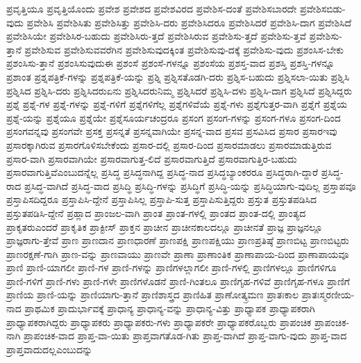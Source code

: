 {ಪ್ರವೃತ್ತಿಯೂ
ಪ್ರವೃತ್ತಿಯೊಂದು
ಪ್ರವೇಶ
ಪ್ರವೇಶದ
ಪ್ರವೇಶವಿರದ
ಪ್ರವೇಶಿಸ-ದಂತೆ
ಪ್ರವೇಶಿಸಬಾರದೇ
ಪ್ರವೇಶಿಸಬಿಡು-ವುದು
ಪ್ರವೇಶಿಸಿ
ಪ್ರವೇಶಿಸಿತು
ಪ್ರವೇಶಿಸಿತ್ತು
ಪ್ರವೇಶಿಸಿ-ದರು
ಪ್ರವೇಶಿಸಿದರೂ
ಪ್ರವೇಶಿಸಿದರೆ
ಪ್ರವೇಶಿಸಿ-ದಾಗ
ಪ್ರವೇಶಿಸಿದೆ
ಪ್ರವೇಶಿಸಿಯೇ
ಪ್ರವೇಶಿಸಿರ-ಬಹುದು
ಪ್ರವೇಶಿಸಿರು-ತ್ತದೆ
ಪ್ರವೇಶಿಸಿರುವ
ಪ್ರವೇಶಿಸು-ತ್ತದೆ
ಪ್ರವೇಶಿಸು-ತ್ತವೆ
ಪ್ರವೇಶಿಸು-ತ್ತಾನೆ
ಪ್ರವೇಶಿಸುವ
ಪ್ರವೇಶಿಸುವವರೆಗಿನ
ಪ್ರವೇಶಿಸುವುದಕ್ಕಿಂತ
ಪ್ರವೇಶಿಸುವು-ದಕ್ಕೆ
ಪ್ರವೇಶಿಸು-ವುದು
ಪ್ರಶಂಸಿಸ-ಬೇಕು
ಪ್ರಶಂಸಿಸು-ತ್ತಾನೆ
ಪ್ರಶಂಸಿಸುವುದುಈ
ಪ್ರಶಂಸೆ
ಪ್ರಶಂಸೆ-ಗಳನ್ನೂ
ಪ್ರಶಂಸೆಯ
ಪ್ರಶಸ್ತ-ವಾದ
ಪ್ರಶಸ್ತಿ
ಪ್ರಶಸ್ತಿ-ಗಳನ್ನೂ
ಪ್ರಶಾಂತ
ಪ್ರಶ್ನಪತ್ರಿಕೆ-ಗಳನ್ನು
ಪ್ರಶ್ನಪತ್ರಿಕೆ-ಯನ್ನು
ಪ್ರಶ್ನಿ
ಪ್ರಶ್ನಿಸತೊಡಗಿ-ದರು
ಪ್ರಶ್ನಿಸ-ಬಹುದು
ಪ್ರಶ್ನಿಸಲಾ-ಯಿತು
ಪ್ರಶ್ನಿಸಿ
ಪ್ರಶ್ನಿಸಿದ
ಪ್ರಶ್ನಿಸಿ-ದರು
ಪ್ರಶ್ನಿಸಿದರುಏನು
ಪ್ರಶ್ನಿಸಿದರುನಿಮ್ಮ
ಪ್ರಶ್ನಿಸಿದರೆ
ಪ್ರಶ್ನಿಸಿ-ದಳು
ಪ್ರಶ್ನಿಸಿ-ದಾಗ
ಪ್ರಶ್ನಿಸಿದೆ
ಪ್ರಶ್ನಿಸಿದ್ದರು
ಪ್ರಶ್ನೆ
ಪ್ರಶ್ನೆ-ಗಳ
ಪ್ರಶ್ನೆ-ಗಳನ್ನು
ಪ್ರಶ್ನೆ-ಗಳಿಗೆ
ಪ್ರಶ್ನೆಗಳಿಗೆಲ್ಲ
ಪ್ರಶ್ನೆಗಳಿವೆಯೆ
ಪ್ರಶ್ನೆ-ಗಳು
ಪ್ರಶ್ನೆಗುತ್ತರ-ವಾಗಿ
ಪ್ರಶ್ನೆಗೆ
ಪ್ರಶ್ನೆಯ
ಪ್ರಶ್ನೆ-ಯನ್ನು
ಪ್ರಶ್ನೆಯೂ
ಪ್ರಶ್ನೆಯೇ
ಪ್ರಶ್ನೆಸೂರ್ಯಚಂದ್ರರೂ
ಪ್ರಸಂಗ
ಪ್ರಸಂಗ-ಗಳನ್ನು
ಪ್ರಸಂಗ-ಗಳೂ
ಪ್ರಸಂಗ-ದಿಂದ
ಪ್ರಸಂಗವನ್ನವು
ಪ್ರಸಂಗವೇ
ಪ್ರಸಕ್ತ
ಪ್ರಸನ್ನತೆ
ಪ್ರಸನ್ನವಾಗಿಯೇ
ಪ್ರಸನ್ನ-ವಾದ
ಪ್ರಸವ
ಪ್ರಸವಿಸಿದ
ಪ್ರಸಾರ
ಪ್ರಸಾರಇವು
ಪ್ರಸಾರಕ್ಕಾಗಿರುವ
ಪ್ರಸಾರಗೊಳಿಸಬೇಕೆಂದು
ಪ್ರಸಾರ-ದಲ್ಲಿ
ಪ್ರಸಾರ-ದಿಂದ
ಪ್ರಸಾರಮಾಡಲು
ಪ್ರಸಾರಮಾಡುತ್ತಿರುವ
ಪ್ರಸಾರ-ವಾಗಿ
ಪ್ರಸಾರವಾಗಿಯೇ
ಪ್ರಸಾರವಾಗುತ್ತ-ಲಿದೆ
ಪ್ರಸಾರವಾಗುತ್ತಿದೆ
ಪ್ರಸಾರವಾಗುತ್ತಿರ-ಬಹುದು
ಪ್ರಸಾರವಾಗುತ್ತಿವೆಎಂಬುದನ್ನೆಲ್ಲ
ಪ್ರಸಿದ್ಧ
ಪ್ರಸಿದ್ಧನಾಗಿದ್ದ
ಪ್ರಸಿದ್ಧ-ನಾದ
ಪ್ರಸಿದ್ಧಬ್ಯಾಂಕರರೂ
ಪ್ರಸಿದ್ಧರಾಗಿ-ದ್ದಾರೆ
ಪ್ರಸಿದ್ಧ-ರಾದ
ಪ್ರಸಿದ್ಧ-ವಾಗಿದೆ
ಪ್ರಸಿದ್ಧ-ವಾದ
ಪ್ರಸಿದ್ಧಿ
ಪ್ರಸಿದ್ಧಿ-ಗಳನ್ನು
ಪ್ರಸಿದ್ಧಿಗೆ
ಪ್ರಸಿದ್ಧಿ-ಯನ್ನು
ಪ್ರಸಿದ್ಧಿಯಾಗು-ವುದಿಲ್ಲ
ಪ್ರಸ್ತಾಪವೂ
ಪ್ರಸ್ತಾಪಿಸದಿದ್ದರೂ
ಪ್ರಸ್ತಾಪಿಸಿ-ದ್ದೇನೆ
ಪ್ರಸ್ತಾಪಿಸಿಲ್ಲ
ಪ್ರಸ್ತಾಪಿ-ಸುತ್ತ
ಪ್ರಸ್ತಾಪಿಸುತ್ತಿದ್ದರು
ಪ್ರಸ್ತುತ
ಪ್ರಸ್ತುತಪಡಿಸಿದ
ಪ್ರಸ್ತುತಪಡಿಸಿ-ದ್ದೇನೆ
ಪ್ರಹ್ಲಾದ
ಪ್ರಾಂಜಲ-ವಾಗಿ
ಪ್ರಾಂತ
ಪ್ರಾಂತ-ಗಳಲ್ಲಿ
ಪ್ರಾಂತದ
ಪ್ರಾಂತ-ದಲ್ಲಿ
ಪ್ರಾಂತ್ಯದ
ಪ್ರಾಕೃತರುಎಂದರೆ
ಪ್ರಾಕೃತಿಕ
ಪ್ರಾಕ್ಟೀಸ್
ಪ್ರಾಕ್ತನ
ಪ್ರಾಚೀನ
ಪ್ರಾಚೀನಕಾಲದಲ್ಲೂ
ಪ್ರಾಚೀನತೆ
ಪ್ರಾಜ್ಞ
ಪ್ರಾಜ್ಞನಲ್ಲೂ
ಪ್ರಾಜ್ಞರಾಗು-ತ್ತೇವೆ
ಪ್ರಾಣ
ಪ್ರಾಣದಾನ
ಪ್ರಾಣಧಾರಣೆ
ಪ್ರಾಣಪಕ್ಷಿ
ಪ್ರಾಣಪಕ್ಷಿಯು
ಪ್ರಾಣಪ್ರತಿಷ್ಠೆ
ಪ್ರಾಣಬಿಟ್ಟ
ಪ್ರಾಣಬಿಟ್ಟರು
ಪ್ರಾಣರಕ್ಷಣೆ-ಗಾಗಿ
ಪ್ರಾಣ-ವನ್ನು
ಪ್ರಾಣವಾಯು
ಪ್ರಾಣವೇ
ಪ್ರಾಣಾ
ಪ್ರಾಣಾಂತಿಕ
ಪ್ರಾಣಾಪಾಯ-ದಿಂದ
ಪ್ರಾಣಾಪಾಯವೂ
ಪ್ರಾಣಿ
ಪ್ರಾಣಿ-ಯಾಗಲೀ
ಪ್ರಾಣಿ-ಗಳ
ಪ್ರಾಣಿ-ಗಳನ್ನು
ಪ್ರಾಣಿಗಳಲ್ಲಾಗಲೀ
ಪ್ರಾಣಿ-ಗಳಲ್ಲಿ
ಪ್ರಾಣಿಗಳಲ್ಲೂ
ಪ್ರಾಣಿಗಳಿಗೂ
ಪ್ರಾಣಿ-ಗಳಿಗೆ
ಪ್ರಾಣಿ-ಗಳು
ಪ್ರಾಣಿ-ಗಳೇ
ಪ್ರಾಣಿಗಳೊಡನೆ
ಪ್ರಾಣಿ-ಗಿಂತಲೂ
ಪ್ರಾಣಿಗೃಹ-ಗಳಿವೆ
ಪ್ರಾಣಿಗೃಹ-ಗಳೂ
ಪ್ರಾಣಿಗೆ
ಪ್ರಾಣಿಯ
ಪ್ರಾಣಿ-ಯನ್ನು
ಪ್ರಾಣಿಯಾಗು-ತ್ತಾನೆ
ಪ್ರಾಣಿಶಾಸ್ತ್ರದ
ಪ್ರಾಣಿಹಿತ
ಪ್ರಾಣೋತ್ಕ್ರಮಣ
ಪ್ರಾತಃಕಾಲ
ಪ್ರಾತಃಸ್ಮರಣೀಯ-ನಾದ
ಪ್ರಾಥಮಿಕ
ಪ್ರಾದುರ್ಭಾವಕ್ಕೆ
ಪ್ರಾಧಾನ್ಯ
ಪ್ರಾಧಾನ್ಯ-ವನ್ನು
ಪ್ರಾಧಾನ್ಯ-ವಿತ್ತು
ಪ್ರಾಧ್ಯಾಪಕ
ಪ್ರಾಧ್ಯಾಪಕರಾಗಿ
ಪ್ರಾಧ್ಯಾಪಕರಾಗಿದ್ದರು
ಪ್ರಾಧ್ಯಾಪಕರು
ಪ್ರಾಧ್ಯಾಪಕರು-ಗಳು
ಪ್ರಾಧ್ಯಾಪಕರೇ
ಪ್ರಾಧ್ಯಾಪಕರೊಬ್ಬರು
ಪ್ರಾಪಂಚಿಕ
ಪ್ರಾಪಂಚಿಕ-ನಾಗಿ
ಪ್ರಾಪಂಚಿಕ-ವಾದ
ಪ್ರಾಪ್ತ-ವಾ-ಯಿತು
ಪ್ರಾಪ್ತವಾಗತೊಡ-ಗಿತು
ಪ್ರಾಪ್ತ-ವಾಗಿದೆ
ಪ್ರಾಪ್ತ-ವಾಗು-ವುದು
ಪ್ರಾಪ್ತ-ವಾದ
ಪ್ರಾಪ್ತವಾದುದಲ್ಲಎಂಬುದನ್ನು
}
